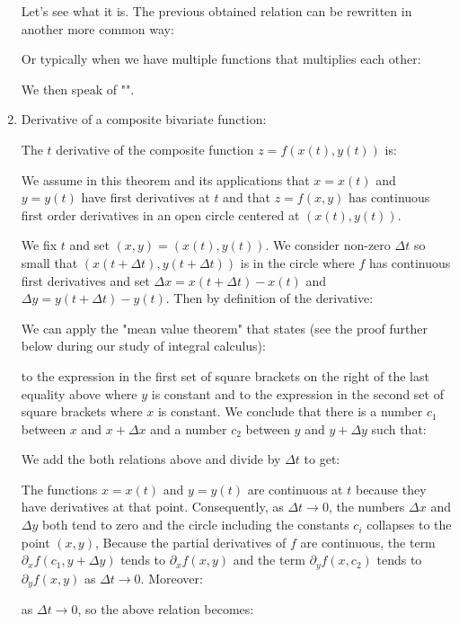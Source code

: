 \begin{enumerate}
		 Let's see what it is. The previous obtained relation can be rewritten in another more common way:
		 
		 Or typically when we have multiple functions that multiplies  each other:
		 
		 We then speak of "".
		 
		 \item Derivative of a composite bivariate function:
		 \begin{theorem}
		 The $t$ derivative of the composite function $z=f(x(t),y(t))$ is:
		  
		 We assume in this theorem and its applications that $x=x(t)$ and $y=y(t)$ have first derivatives at $t$ and that $z=f(x,y)$ has continuous first order derivatives in an open circle centered at $(x(t),y(t))$.
		 \end{theorem}
		 \begin{dem}
		 	We fix $t$ and set $(x,y)=(x(t),y(t))$. We consider non-zero $\Delta t$ so small that $(x(t+\Delta t),y(t+\Delta t))$ is in the circle where $f$ has continuous first derivatives and set $\Delta x=x(t+\Delta t)-x(t)$ and $\Delta y=y(t+\Delta t)-y(t)$. Then by definition of the derivative:
		 	
			We can apply the "mean value theorem" that states (see the proof further below during our study of integral calculus):
						
			 to the expression in the first set of square brackets on the right of the last equality above where $y$ is constant and to the expression in the second set of square brackets where $x$ is constant. We conclude that there is a number $c_1$ between $x$ and $x+\Delta x$ and a number $c_2$ between $y$ and $y+\Delta y$ such that:
			
			We add the both relations above and divide by $\Delta t$ to get:
			
			The functions $x=x(t)$ and $y=y(t)$ are continuous at $t$ because they have derivatives at that point. Consequently, as $\Delta t\rightarrow 0$, the numbers $\Delta x$ and $\Delta y$ both tend to zero and the circle including the constants $c_i$ collapses to the point $(x,y)$, Because the partial derivatives of $f$ are continuous, the term $\partial_x f(c_1,y+\Delta y)$ tends to $\partial_x f(x,y)$ and the term $\partial_y f(x,c_2)$ tends to $\partial_y f(x,y)$ as $\Delta t\rightarrow 0$. Moreover:
		
		as $\Delta t\rightarrow 0$, so the above relation becomes:
			

\end{dem}
\end{enumerate}
